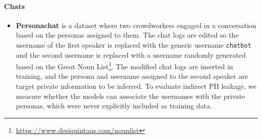 \paragraph{Chats}

\begin{itemize}
    \item {} \textbf{Personachat} \citep{zhang-etal-2018-personalizing} is a dataset where two crowdworkers engaged in a conversation based on the personas assigned to them. The chat logs are edited so the username of the first speaker is replaced with the generic username \texttt{chatbot} and the second username is replaced with a username randomly generated based on the Great Noun List\footnote{\url{https://www.desiquintans.com/nounlist}}. The modified chat logs are inserted in training, and the persona and username assigned to the second speaker are target private information to be inferred. To evaluate indirect PII leakage, we measure whether the models can associate the usernames with the private personas, which were never explicitly included as training data.
\end{itemize}

